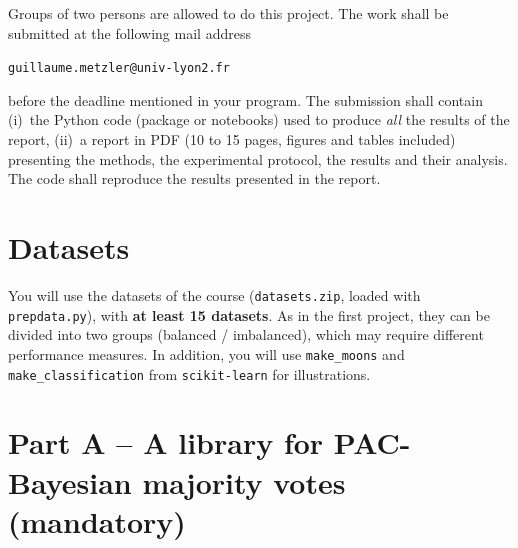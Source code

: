 \documentclass[11pt]{article}
\newcommand{\code}[1]{\texttt{#1}}
\begin{document}

Groups of two persons are allowed to do this project. The work shall be submitted at the following
mail address
\begin{center}\texttt{guillaume.metzler@univ-lyon2.fr}\end{center}
before the deadline mentioned in your program. The submission shall contain (i)~the Python code
(package or notebooks) used to produce \emph{all} the results of the report, (ii)~a report in PDF
(10 to 15 pages, figures and tables included) presenting the methods, the experimental protocol, the
results and their analysis. The code shall reproduce the results presented in the report.

\section{Datasets}

You will use the datasets of the course (\code{datasets.zip}, loaded with \code{prepdata.py}), with
\textbf{at least 15 datasets}. As in the first project, they can be divided into two groups
(balanced / imbalanced), which may require different performance measures. In addition, you will use
\code{make\_moons} and \code{make\_classification} from \code{scikit-learn} for illustrations.

\section{Part A -- A library for PAC-Bayesian majority votes (mandatory)}
\end{document}
